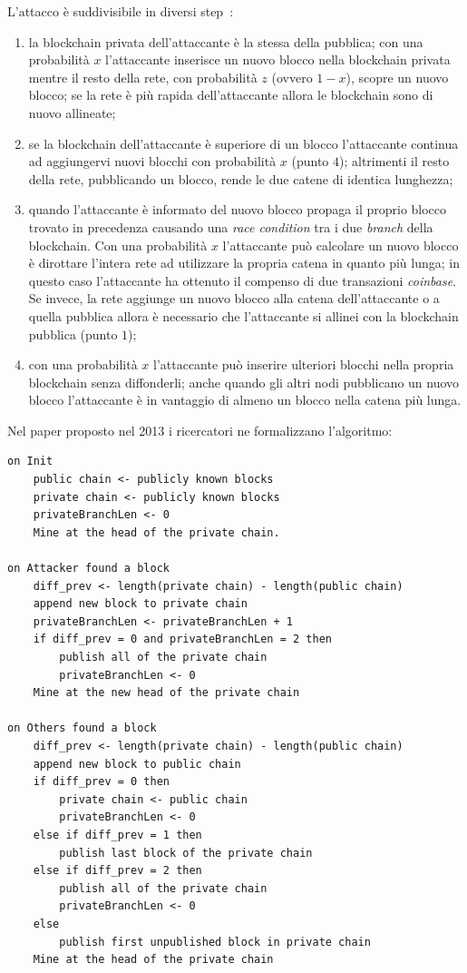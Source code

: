 L'attacco è suddivisibile in diversi step~\cite{selfishvitalik}:
\begin{enumerate}
    \item la blockchain privata dell'attaccante è la stessa della pubblica; con una probabilità $x$ l'attaccante inserisce un nuovo blocco nella blockchain privata mentre il resto della rete, con probabilità $z$ (ovvero $1-x$), scopre un nuovo blocco; se la rete è più rapida dell'attaccante allora le blockchain sono di nuovo allineate;
    \item se la blockchain dell'attaccante è superiore di un blocco l'attaccante continua ad aggiungervi nuovi blocchi con probabilità $x$ (punto $4$); altrimenti il resto della rete, pubblicando un blocco, rende le due catene di identica lunghezza;
    \item quando l'attaccante è informato del nuovo blocco propaga il proprio blocco trovato in precedenza causando una \textit{race condition} tra i due \textit{branch} della blockchain. Con una probabilità $x$ l'attaccante può calcolare un nuovo blocco è dirottare l'intera rete ad utilizzare la propria catena in quanto più lunga; in questo caso l'attaccante ha ottenuto il compenso di due transazioni \textit{coinbase}. Se invece, la rete aggiunge un nuovo blocco alla catena dell'attaccante o a quella pubblica allora è necessario che l'attaccante si allinei con la blockchain pubblica (punto $1$);
    \item con una probabilità $x$ l'attaccante può inserire ulteriori blocchi nella propria blockchain senza diffonderli; anche quando gli altri nodi pubblicano un nuovo blocco l'attaccante è in vantaggio di almeno un blocco nella catena più lunga.
\end{enumerate}
Nel paper proposto nel 2013 i ricercatori ne formalizzano l'algoritmo:
\begin{lstlisting}[label={lst:selfish},caption=Pseudocodice dell'algoritmo di \textit{Selfish Mining} proposto da alcuni ricercatori della \textit{Cornell University}]
on Init
    public chain <- publicly known blocks
    private chain <- publicly known blocks
    privateBranchLen <- 0
    Mine at the head of the private chain.

on Attacker found a block
    diff_prev <- length(private chain) - length(public chain)
    append new block to private chain
    privateBranchLen <- privateBranchLen + 1
    if diff_prev = 0 and privateBranchLen = 2 then
        publish all of the private chain
        privateBranchLen <- 0
    Mine at the new head of the private chain

on Others found a block
    diff_prev <- length(private chain) - length(public chain)
    append new block to public chain
    if diff_prev = 0 then
        private chain <- public chain
        privateBranchLen <- 0
    else if diff_prev = 1 then
        publish last block of the private chain
    else if diff_prev = 2 then
        publish all of the private chain
        privateBranchLen <- 0
    else
        publish first unpublished block in private chain
    Mine at the head of the private chain
\end{lstlisting}
